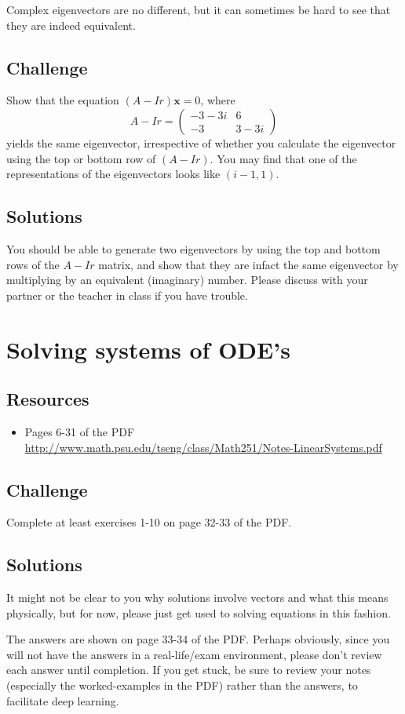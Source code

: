 Complex eigenvectors are no different, but it can sometimes be hard to see that they are indeed equivalent.

\subsection*{Challenge}
Show that the equation $(A - Ir)\bm{x} = {0}$, where
\begin{equation}
     A-Ir = \left(
        \begin{array}{cc}
            -3 -3i & 6 \\
            -3 & 3-3i
        \end{array}
    \right)
\end{equation}
yields the same eigenvector, irrespective of whether you calculate the eigenvector using the top or bottom row of $(A-Ir)$. You may find that one of the representations of the eigenvectors looks like $(i-1,1)$.

\subsection*{Solutions}
You should be able to generate two eigenvectors by using the top and bottom rows of the $A-Ir$ matrix, and show that they are infact the same eigenvector by multiplying by an equivalent (imaginary) number. Please discuss with your partner or the teacher in class if you have trouble.



\newpage
\section{Solving systems of ODE's}

\subsection*{Resources}
\begin{itemize}
    \item Pages 6-31 of the PDF \url{http://www.math.psu.edu/tseng/class/Math251/Notes-LinearSystems.pdf} 
\end{itemize}

\subsection*{Challenge}
Complete at least exercises 1-10 on page 32-33 of the PDF.

\subsection*{Solutions}
It might not be clear to you why solutions involve vectors and what this means physically, but for now, please just get used to solving equations in this fashion.

The answers are shown on page 33-34 of the PDF. Perhaps obviously, since you will not have the answers in a real-life/exam environment, please don't review each answer until completion. If you get stuck, be sure to review your notes (especially the worked-examples in the PDF) rather than the answers, to facilitate deep learning. 
